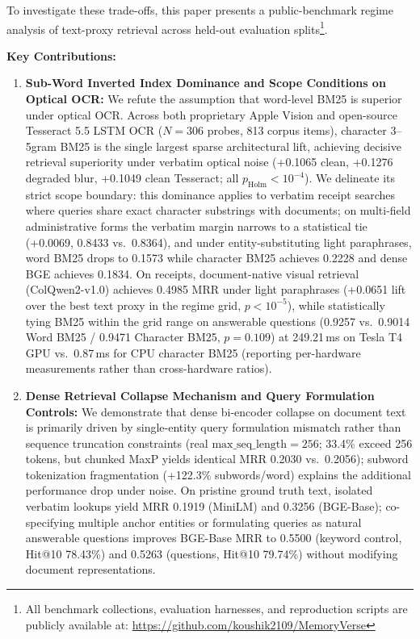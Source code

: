 \documentclass[conference]{IEEEtran}
\begin{document}
To investigate these trade-offs, this paper presents a public-benchmark regime analysis of text-proxy retrieval across held-out evaluation splits\footnote{All benchmark collections, evaluation harnesses, and reproduction scripts are publicly available at: \url{https://github.com/koushik2109/MemoryVerse}}.

\textbf{Key Contributions:}
\begin{enumerate}
    \setlength{\itemsep}{1pt plus 0.5pt}
    \setlength{\parskip}{0pt}
    \item \textbf{Sub-Word Inverted Index Dominance and Scope Conditions on Optical OCR:} We refute the assumption that word-level BM25 is superior under optical OCR. Across both proprietary Apple Vision and open-source Tesseract 5.5 LSTM OCR ($N=306$ probes, 813 corpus items), character 3--5gram BM25 is the single largest sparse architectural lift, achieving decisive retrieval superiority under verbatim optical noise (+0.1065 clean, +0.1276 degraded blur, +0.1049 clean Tesseract; all $p_{\text{Holm}} < 10^{-4}$). We delineate its strict scope boundary: this dominance applies to verbatim receipt searches where queries share exact character substrings with documents; on multi-field administrative forms the verbatim margin narrows to a statistical tie (+0.0069, 0.8433 vs.\ 0.8364), and under entity-substituting light paraphrases, word BM25 drops to 0.1573 while character BM25 achieves 0.2228 and dense BGE achieves 0.1834. On receipts, document-native visual retrieval (ColQwen2-v1.0) achieves 0.4985 MRR under light paraphrases (+0.0651 lift over the best text proxy in the regime grid, $p < 10^{-5}$), while statistically tying BM25 within the grid range on answerable questions (0.9257 vs.\ 0.9014 Word BM25 / 0.9471 Character BM25, $p = 0.109$) at 249.21\,ms on Tesla T4 GPU vs.\ 0.87\,ms for CPU character BM25 (reporting per-hardware measurements rather than cross-hardware ratios).
    \item \textbf{Dense Retrieval Collapse Mechanism and Query Formulation Controls:} We demonstrate that dense bi-encoder collapse on document text is primarily driven by single-entity query formulation mismatch rather than sequence truncation constraints (real $\text{max\_seq\_length}=256$; 33.4\% exceed 256 tokens, but chunked MaxP yields identical MRR 0.2030 vs.\ 0.2056); subword tokenization fragmentation (+122.3\% subwords/word) explains the additional performance drop under noise. On pristine ground truth text, isolated verbatim lookups yield MRR 0.1919 (MiniLM) and 0.3256 (BGE-Base); co-specifying multiple anchor entities or formulating queries as natural answerable questions improves BGE-Base MRR to 0.5500 (keyword control, Hit@10 78.43\%) and 0.5263 (questions, Hit@10 79.74\%) without modifying document representations.

\end{enumerate}
\end{document}
